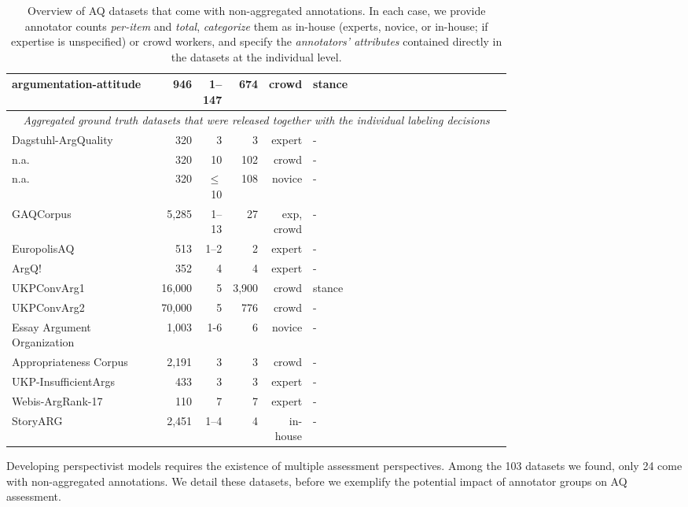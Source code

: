 \begin{table*}[t]
\begin{tabular}{p{0.31\linewidth}@{}rrrrp{0.43\linewidth}}
argumentation-attitude \cite{brenneis-etal-2021-will} & 946 & 1--147 & 674 & crowd & stance \\
\midrule
\multicolumn{6}{c}{\em Aggregated ground truth datasets that were released together with the individual labeling decisions}\\
\midrule
Dagstuhl-ArgQuality \cite{wachsmuth-etal-2017-computational} & 320 & 3 & 3 & expert & - \\
n.a. \cite{wachsmuth-etal-2017-argumentation} & 320 & 10 & 102 & crowd & - \\
n.a. \cite{mirzakhmedova2024reliable} & 320 & $\leq$ 10 & 108 & novice & - \\
GAQCorpus \cite{lauscher-etal-2020-rhetoric} & 5,285 & 1--13 & 27 & exp, crowd & - \\
EuropolisAQ \cite{falk-lapesa-2022-scaling} & 513 & 1--2 & 2 & expert & - \\
ArgQ! \citet{silva2021quality} & 352 & 4 & 4 & expert & - \\
UKPConvArg1 \cite{habernal-gurevych-2016-argument}  & 16,000 & 5 & 3,900 & crowd & stance \\
UKPConvArg2 \cite{habernal-gurevych-2016-makes} & 70,000 & 5 & 776 & crowd & - \\
Essay Argument Organization \cite{persing-etal-2010-modeling} & 1,003 & 1-6 & 6 & novice & - \\
Appropriateness Corpus \cite{ziegenbein-etal-2023-modeling} & 2,191 & 3 & 3 & crowd & - \\
UKP-InsufficientArgs \cite{stab-gurevych-2017-recognizing} & 433 & 3 & 3 & expert & - \\
Webis-ArgRank-17 \cite{wachsmuth-etal-2017-pagerank} & 110 & 7 & 7 & expert & - \\
StoryARG \cite{falk-lapesa-2023-storyarg} & 2,451 & 1--4 & 4 & in-house & - \\
\bottomrule
\end{tabular}
\caption{Overview of AQ datasets that come with non-aggregated annotations. In each case, we provide annotator counts \emph{per-item} and \emph{total}, \emph{categorize} them as in-house (experts, novice, or in-house; if expertise is unspecified) or crowd workers, and specify the \emph{annotators' attributes} contained directly in the datasets at the individual level.}
\label{tab:dataset_sizes}
\end{table*}

Developing perspectivist models requires the existence of multiple assessment perspectives. Among the 103 datasets we found, only 24 come with non-aggregated annotations. We detail these datasets, before we exemplify the potential impact of annotator groups on AQ assessment.

